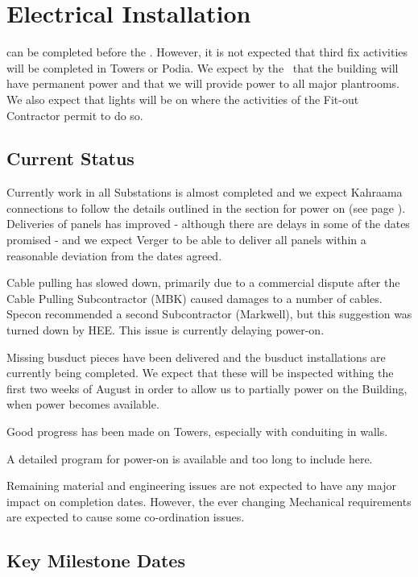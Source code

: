 \chapter{Electrical Installation}
\label{ch:electrical}

 can be completed before the \deadline. However, it is not expected that third fix activities will be completed in Towers or Podia.  We expect by the \deadline~that the building will have permanent power and that we will provide power to all major plantrooms. We also expect that lights will be on where the activities of the Fit-out Contractor permit to do so.

\section{Current Status}
Currently work in all Substations is almost completed and we expect Kahraama connections to follow the details outlined in the section for power on (see page \pageref{ch:kahraama}). Deliveries of panels has improved - although there are delays in some of the dates promised - and we expect Verger to be able to deliver all panels within a reasonable deviation from the dates agreed.

Cable pulling has slowed down, primarily due to a commercial dispute after the Cable Pulling Subcontractor (MBK) caused damages to a number of cables. Specon recommended a second Subcontractor (Markwell), but this suggestion was turned down by HEE. This issue is currently delaying power-on.

Missing busduct pieces have been delivered and the busduct installations are currently being completed. We expect that these will be inspected withing the first two weeks of August in order to allow us to partially power on the Building, when power becomes available. 

Good progress has been made on Towers, especially with conduiting in walls.

A detailed program for power-on is available and too long to include here.

Remaining material and engineering issues are not expected to have any major impact on completion dates. However, the ever changing Mechanical requirements are expected to cause some co-ordination issues.

\section{Key Milestone Dates}

